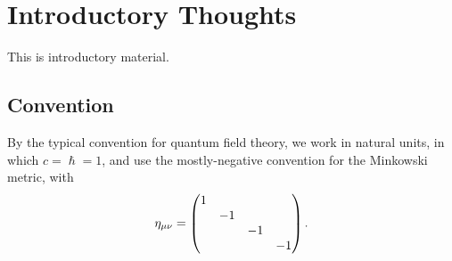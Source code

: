 \documentclass[notes]{subfiles}
\begin{document}
\chapter*{Introductory Thoughts}
\label{chap:intro}
This is introductory material.
\section*{Convention}
By the typical convention for quantum field theory, we work in natural units, in which $c = \hslash = 1$, and use the mostly-negative convention for the Minkowski metric, with 
\begin{equation*}
    \eta_{\mu\nu} = \begin{pmatrix}
        \dmat{1, -1, -1, -1}
    \end{pmatrix}.
\end{equation*}
\end{document}
